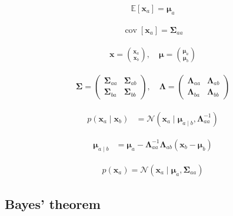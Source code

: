 \documentclass{article}
\begin{document}
\begin{align*}
\mathbb{E}\left[\mathbf{x}_{a}\right] = \boldsymbol{\mu}_{a}
\tag{3.76}
\end{align*}

\begin{align*}
\operatorname{cov}\left[\mathbf{x}_{a}\right] = \boldsymbol{\Sigma}_{a a}
\tag{3.77}
\end{align*}

\begin{align*}
\mathbf{x} = \binom{\mathbf{x}_{a}}{\mathbf{x}_{b}}, \quad \boldsymbol{\mu} = \binom{\boldsymbol{\mu}_{a}}{\boldsymbol{\mu}_{b}} 
\tag{3.78}
\end{align*}

\begin{align*}
\boldsymbol{\Sigma} = \left(\begin{array}{ll}
\boldsymbol{\Sigma}_{a a} & \boldsymbol{\Sigma}_{a b} \\
\boldsymbol{\Sigma}_{b a} & \boldsymbol{\Sigma}_{b b}
\end{array}\right), \quad \boldsymbol{\Lambda} = \left(\begin{array}{ll}
\boldsymbol{\Lambda}_{a a} & \boldsymbol{\Lambda}_{a b} \\
\boldsymbol{\Lambda}_{b a} & \boldsymbol{\Lambda}_{b b}
\end{array}\right)
\tag{3.79}
\end{align*}

\begin{align*}
p\left(\mathbf{x}_{a} \mid \mathbf{x}_{b}\right) & = \mathcal{N}\left(\mathbf{x}_{a} \mid \boldsymbol{\mu}_{a \mid b}, \boldsymbol{\Lambda}_{a a}^{-1}\right)
\tag{3.80}
\end{align*}

\begin{align*}
\boldsymbol{\mu}_{a \mid b} & = \boldsymbol{\mu}_{a} - \boldsymbol{\Lambda}_{a a}^{-1} \boldsymbol{\Lambda}_{a b}\left(\mathbf{x}_{b} - \boldsymbol{\mu}_{b}\right)
\tag{3.81}
\end{align*}

\begin{align*}
p\left(\mathbf{x}_{a}\right) = \mathcal{N}\left(\mathbf{x}_{a} \mid \boldsymbol{\mu}_{a}, \boldsymbol{\Sigma}_{a a}\right)
\tag{3.82}
\end{align*}

\subsection{Bayes' theorem}
\end{document}
